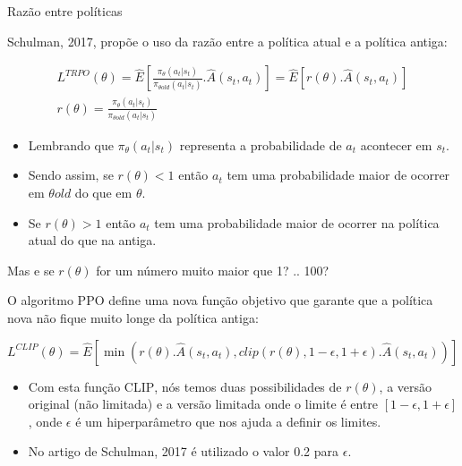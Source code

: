 \documentclass{beamer}
\begin{document}
\begin{frame}{Razão entre políticas}
	
	Schulman, 2017, propõe o uso da razão entre a política atual e a política antiga: 
	
	\begin{eqnarray}
	L^{TRPO}(\theta) = \hat{E} \left[\frac{\pi_{\theta}(a_{t}|s_{t})}{\pi_{\theta old}(a_{t}|s_{t})}.\hat{A}(s_{t},a_{t}) \right] = \hat{E}  \left[ r(\theta). \hat{A}(s_{t},a_{t}) \right] \\	
	r(\theta) = \frac{\pi_{\theta}(a_{t}|s_{t})}{\pi_{\theta old}(a_{t}|s_{t})} 
	\end{eqnarray}


\begin{itemize}
	\item Lembrando que $\pi_{\theta}(a_{t}|s_{t})$ representa a probabilidade de $a_{t}$ acontecer em $s_{t}$.
	\item Sendo assim, se $r(\theta) < 1$ então $a_{t}$ tem uma probabilidade maior de ocorrer em $\theta old$ do que em $\theta$.
	\item Se $r(\theta) > 1$ então $a_{t}$ tem uma probabilidade maior de ocorrer na política atual do que na antiga. 
\end{itemize}

\end{frame}


\begin{frame}{Mas e se $r(\theta)$ for um número muito maior que 1? .. 100?}
	
O algoritmo PPO define uma nova função objetivo que garante que a política nova não fique muito longe da política antiga:
	
	\begin{equation}
	L^{CLIP}(\theta) = \hat{E} \left[ \nonumber \min \left( \nonumber r(\theta).\hat{A}(s_{t},a_{t}), clip(r(\theta), 1 - \epsilon, 1 + \epsilon).\hat{A}(s_{t},a_{t}) \nonumber \right) \right]		
	\end{equation}

\begin{itemize}
	\item Com esta função \textsc{CLIP}, nós temos duas possibilidades de $r(\theta)$, a versão original (não limitada) e a versão limitada onde o limite é entre $\left[ 1 - \epsilon, 1 + \epsilon \right]$, onde $\epsilon$ é um hiperparâmetro que nos ajuda a definir os limites. 
	\item No artigo de Schulman, 2017 é utilizado o valor 0.2 para $\epsilon$.
\end{itemize}
	
\end{frame}
\end{document}
